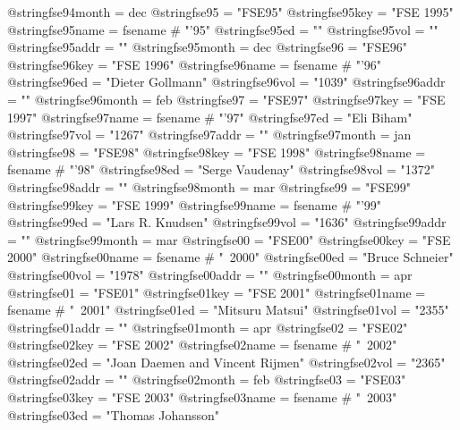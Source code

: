 @string{fse94month =            dec}
@string{fse95 =                 "FSE95"}
@string{fse95key =              "FSE 1995"}
@string{fse95name =             fsename # "'95"}
@string{fse95ed =               ""}
@string{fse95vol =              ""}
@string{fse95addr =             ""}
@string{fse95month =            dec}
@string{fse96 =                 "FSE96"}
@string{fse96key =              "FSE 1996"}
@string{fse96name =             fsename # "'96"}
@string{fse96ed =               "Dieter Gollmann"}
@string{fse96vol =              "1039"}
@string{fse96addr =             ""}
@string{fse96month =            feb}
@string{fse97 =                 "FSE97"}
@string{fse97key =              "FSE 1997"}
@string{fse97name =             fsename # "'97"}
@string{fse97ed =               "Eli Biham"}
@string{fse97vol =              "1267"}
@string{fse97addr =             ""}
@string{fse97month =            jan}
@string{fse98 =                 "FSE98"}
@string{fse98key =              "FSE 1998"}
@string{fse98name =             fsename # "'98"}
@string{fse98ed =               "Serge Vaudenay"}
@string{fse98vol =              "1372"}
@string{fse98addr =             ""}
@string{fse98month =            mar}
@string{fse99 =                 "FSE99"}
@string{fse99key =              "FSE 1999"}
@string{fse99name =             fsename # "'99"}
@string{fse99ed =               "Lars R. Knudsen"}
@string{fse99vol =              "1636"}
@string{fse99addr =             ""}
@string{fse99month =            mar}
@string{fse00 =                 "FSE00"}
@string{fse00key =              "FSE 2000"}
@string{fse00name =             fsename # "~2000"}
@string{fse00ed =               "Bruce Schneier"}
@string{fse00vol =              "1978"}
@string{fse00addr =             ""}
@string{fse00month =            apr}
@string{fse01 =                 "FSE01"}
@string{fse01key =              "FSE 2001"}
@string{fse01name =             fsename # "~2001"}
@string{fse01ed =               "Mitsuru Matsui"}
@string{fse01vol =              "2355"}
@string{fse01addr =             ""}
@string{fse01month =            apr}
@string{fse02 =                 "FSE02"}
@string{fse02key =              "FSE 2002"}
@string{fse02name =             fsename # "~2002"}
@string{fse02ed =               "Joan Daemen and Vincent Rijmen"}
@string{fse02vol =              "2365"}
@string{fse02addr =             ""}
@string{fse02month =            feb}
@string{fse03 =                 "FSE03"}
@string{fse03key =              "FSE 2003"}
@string{fse03name =             fsename # "~2003"}
@string{fse03ed =               "Thomas Johansson"}
